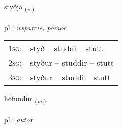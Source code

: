 \documentclass[frontgrid, backgrid]{flacards}\usepackage[]{graphicx}\usepackage[]{xcolor}
\begin{document}
{styðja \small{\textsubscript{(\textit{v.})}} \\[1ex] %
\textphonetic{[stɪðja]} \\
pl.: \emph{wsparcie, pomoc} \\  [2ex]
\renewcommand*{\arraystretch}{0.8}
\begin{tabular}{p{1cm}l}
\textsc{1sg}: & styð -- studdi -- stutt \\ 
\textsc{2sg}: & styður -- studdir -- stutt \\ 
\textsc{3sg}: & styður -- studdi -- stutt \\ 
\end{tabular}
}

\renewcommand{\flhead}{\vskip5pt \fboxsep=0pt {\small\bfseries\footnotesize Nafnorð | rzeczownik}}
\renewcommand{\fcfoot}{\vskip5pt \fboxsep=0pt \hspace{2pt}{\small\bfseries\footnotesize 1K}}

\renewcommand{\blhead}{\vskip5pt {\small\bfseries\footnotesize Nafnorð | rzeczownik }}
\renewcommand{\bcfoot}{\vskip5pt \hspace{2pt}{\small\bfseries\footnotesize 1K}}


{höfundur \small{\textsubscript{(\textit{m.})}} \\[1ex] %
\textphonetic{[hœːvʏntʏr]} \\
pl.: \emph{autor} \\  [2ex]
\renewcommand*{\arraystretch}{0.8}
}

\renewcommand{\flhead}{\vskip5pt \fboxsep=0pt {\small\bfseries\footnotesize Nafnorð | rzeczownik}}
\renewcommand{\fcfoot}{\vskip5pt \fboxsep=0pt \hspace{2pt}{\small\bfseries\footnotesize 1K}}
\end{document}
